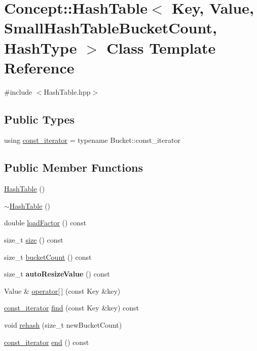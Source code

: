 \hypertarget{class_concept_1_1_hash_table}{}\section{Concept\+::Hash\+Table$<$ Key, Value, Small\+Hash\+Table\+Bucket\+Count, Hash\+Type $>$ Class Template Reference}
\label{class_concept_1_1_hash_table}


{\ttfamily \#include $<$Hash\+Table.\+hpp$>$}

\subsection*{Public Types}
\begin{DoxyCompactItemize}
\item 
using \mbox{\hyperlink{class_concept_1_1_hash_table_a567c99ad671a5065563483689abdf399}{const\+\_\+iterator}} = typename Bucket\+::const\+\_\+iterator
\end{DoxyCompactItemize}
\subsection*{Public Member Functions}
\begin{DoxyCompactItemize}
\item 
\mbox{\hyperlink{class_concept_1_1_hash_table_a5a2046a7319fe85a746fc2bbfef8c55d}{Hash\+Table}} ()
\item 
\mbox{\hyperlink{class_concept_1_1_hash_table_ae99a90d710d059df81e6a75ef43c3569}{$\sim$\+Hash\+Table}} ()
\item 
double \mbox{\hyperlink{class_concept_1_1_hash_table_a6211e9857610c29fb0665177e3d365e8}{load\+Factor}} () const
\item 
size\+\_\+t \mbox{\hyperlink{class_concept_1_1_hash_table_ae68cb33ed169ec0072be4fbeab1e4ff7}{size}} () const
\item 
size\+\_\+t \mbox{\hyperlink{class_concept_1_1_hash_table_aab2236e5ef9f27eeed418a00bdea65b8}{bucket\+Count}} () const
\item 
\mbox{\label{class_concept_1_1_hash_table_ab964fc586a87b5cf5f5de874ac345785}} 
size\+\_\+t {\bfseries auto\+Resize\+Value} () const
\item 
Value \& \mbox{\hyperlink{class_concept_1_1_hash_table_a4172a9c3b5c528b5d0b79b1c58ab2baf}{operator\mbox{[}$\,$\mbox{]}}} (const Key \&key)
\item 
\mbox{\hyperlink{class_concept_1_1_hash_table_a567c99ad671a5065563483689abdf399}{const\+\_\+iterator}} \mbox{\hyperlink{class_concept_1_1_hash_table_acaa2106cab7de32f3a6467b023d04773}{find}} (const Key \&key) const
\item 
void \mbox{\hyperlink{class_concept_1_1_hash_table_aae3621f4d8568e90844b7366c030321b}{rehash}} (size\+\_\+t new\+Bucket\+Count)
\item 
\mbox{\hyperlink{class_concept_1_1_hash_table_a567c99ad671a5065563483689abdf399}{const\+\_\+iterator}} \mbox{\hyperlink{class_concept_1_1_hash_table_a4621e02c1fedb16e29a88ae0b517ffd2}{end}} () const
\end{DoxyCompactItemize}
